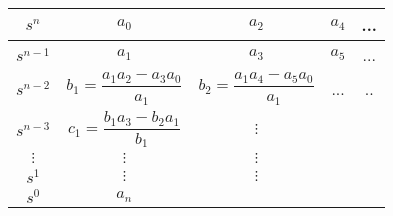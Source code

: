 \begin{tabular}{|c|c|c|c|c|}
\hline 
$s^n$ & $ a_0 $ & $a_2 $ &  $a_4$ & ... \\
\hline
$s^{n-1}$ &$a_1$&$a_3$&$a_5$&...  \\
\hline
$s^{n-2} $& $b_1 = \dfrac{a_1a_2-a_3a_0}{a_1}$ &$b_2 = \dfrac{a_1a_4 - a_5a_0}{a_1}$ &...&..\\
\hline
$s^{n-3} $& $c_1 = \dfrac{b_1a_3-b_2a_1}{b_1}$  & $\vdots$ && \\
\hline
$\vdots$ & $\vdots$ & $\vdots$&&\\
\hline
$s^1$&$\vdots$&$\vdots$&&\\
\hline
$s^0$&$a_n$&&&\\
\hline
\end{tabular}
